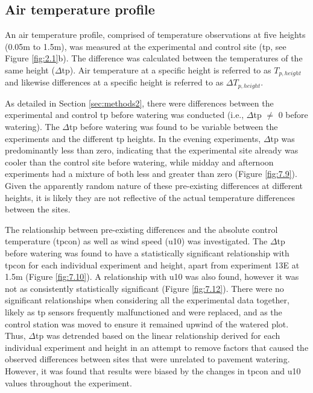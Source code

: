 \documentclass[final,3p,times,authoryear]{elsarticle}
\begin{document}
\subsection{Air temperature profile}\label{sec:discussion3.1}

An air temperature profile, comprised of temperature observations at five heights (0.05m to 1.5m), was measured at the experimental and control site (\gls{tp}, see Figure \ref{fig:2.1}b). The difference was calculated between the temperatures of the same height ($\Delta$\gls{tp}). Air temperature at a specific height is referred to as $T_{p,height}$ and likewise differences at a specific height is referred to as $\Delta$$T_{p,height}$.

As detailed in Section \ref{sec:methods2}, there were differences between the experimental and control \gls{tp} before watering was conducted (i.e., $\Delta$\gls{tp} $\neq$ 0 before watering). The $\Delta$\gls{tp} before watering was found to be variable between the experiments and the different \gls{tp} heights. In the evening experiments, $\Delta$\gls{tp} was predominantly less than zero, indicating that the experimental site already was cooler than the control site before watering, while midday and afternoon experiments had a mixture of both less and greater than zero (Figure \ref{fig:7.9}). Given the apparently random nature of these pre-existing differences at different heights, it is likely they are not reflective of the actual temperature differences between the sites.

The relationship between pre-existing differences and the absolute control temperature (\gls{tpcon}) as well as wind speed (\gls{u10}) was investigated. The $\Delta$\gls{tp} before watering was found to have a statistically significant relationship with \gls{tpcon} for each individual experiment and height, apart from experiment 13E at 1.5m (Figure \ref{fig:7.10}). A relationship with \gls{u10} was also found, however it was not as consistently statistically significant (Figure \ref{fig:7.12}). There were no significant relationships when considering all the experimental data together, likely as \gls{tp} sensors frequently malfunctioned and were replaced, and as the control station was moved to ensure it remained upwind of the watered plot. Thus, $\Delta$\gls{tp} was detrended based on the linear relationship derived for each individual experiment and height in an attempt to remove factors that caused the observed differences between sites that were unrelated to pavement watering. However, it was found that results were biased by the changes in \gls{tpcon} and \gls{u10} values throughout the experiment.
\end{document}
